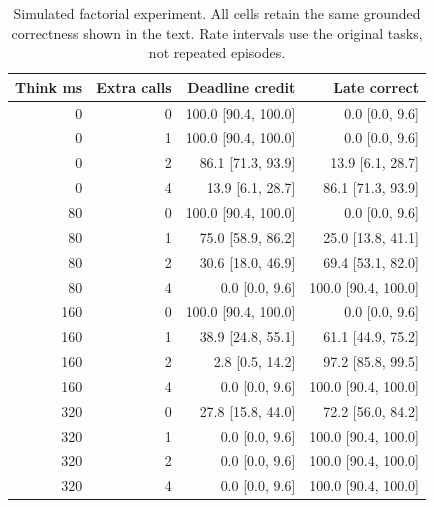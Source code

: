 \begin{table}[htbp]
\centering\small
\caption{Simulated factorial experiment. All cells retain the same grounded correctness shown in the text. Rate intervals use the original tasks, not repeated episodes.}\label{tab:grid}
\begin{tabular}{rrrr}\toprule
Think ms & Extra calls & Deadline credit & Late correct \\\midrule
0 & 0 & 100.0 [90.4, 100.0] & 0.0 [0.0, 9.6] \\
0 & 1 & 100.0 [90.4, 100.0] & 0.0 [0.0, 9.6] \\
0 & 2 & 86.1 [71.3, 93.9] & 13.9 [6.1, 28.7] \\
0 & 4 & 13.9 [6.1, 28.7] & 86.1 [71.3, 93.9] \\
80 & 0 & 100.0 [90.4, 100.0] & 0.0 [0.0, 9.6] \\
80 & 1 & 75.0 [58.9, 86.2] & 25.0 [13.8, 41.1] \\
80 & 2 & 30.6 [18.0, 46.9] & 69.4 [53.1, 82.0] \\
80 & 4 & 0.0 [0.0, 9.6] & 100.0 [90.4, 100.0] \\
160 & 0 & 100.0 [90.4, 100.0] & 0.0 [0.0, 9.6] \\
160 & 1 & 38.9 [24.8, 55.1] & 61.1 [44.9, 75.2] \\
160 & 2 & 2.8 [0.5, 14.2] & 97.2 [85.8, 99.5] \\
160 & 4 & 0.0 [0.0, 9.6] & 100.0 [90.4, 100.0] \\
320 & 0 & 27.8 [15.8, 44.0] & 72.2 [56.0, 84.2] \\
320 & 1 & 0.0 [0.0, 9.6] & 100.0 [90.4, 100.0] \\
320 & 2 & 0.0 [0.0, 9.6] & 100.0 [90.4, 100.0] \\
320 & 4 & 0.0 [0.0, 9.6] & 100.0 [90.4, 100.0] \\\bottomrule
\end{tabular}
\end{table}
